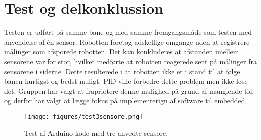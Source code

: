 \section{Test og delkonklussion}
Testen er udført på samme bane og med samme fremgangsmåde som testen med anvendelse af én sensor. Robotten foretog adskellige omgange uden at registrere målinger som afsporede robotten. Det kan konkluderes at afstanden imellem sensorene var for stor, hvilket medførte at robotten reagerede sent på målinger fra sensorene i siderne. Dette resulterede i at robotten ikke er i stand til at følge banen hurtigst og bedst muligt. 
PID ville forbedre dette problem men ikke løse det. Gruppen har valgt at frapriotere denne mulighed på grund af manglende tid og derfor har valgt at lægge fokus på implementerign af software til embedded. 



\begin{figure}[h!]
  \centering
  \texttt{[image: figures/test3sensore.png]}
  \caption{Test af Arduino kode med tre anvedte sensore.}
  \label{test_3_sensore}
\end{figure}



